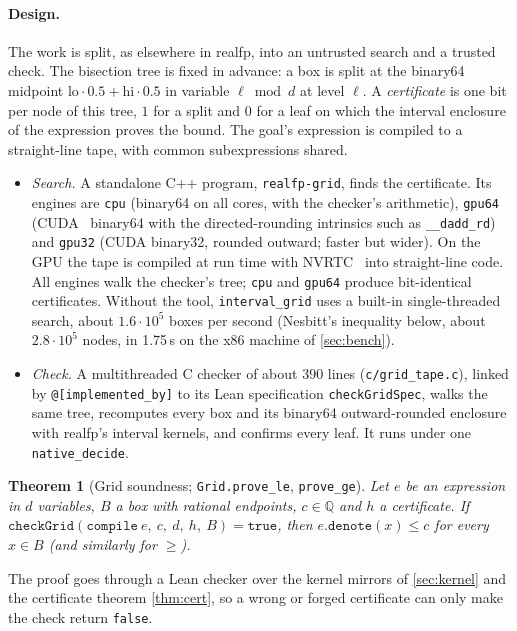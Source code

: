 \documentclass[11pt]{article}
\newtheorem{theorem}{Theorem}
\theoremstyle{definition}
\theoremstyle{remark}
\newcommand{\Q}{\mathbb{Q}}
\newcommand{\lean}[1]{\texttt{#1}}
\newcommand{\realfp}{\textsf{realfp}}
\begin{document}
\paragraph{Design.} The work is split, as elsewhere in \realfp{}, into an
untrusted search and a trusted check. The bisection tree is fixed in
advance: a box is split at the binary64 midpoint
$\mathrm{lo}\cdot0.5+\mathrm{hi}\cdot0.5$ in variable $\ell\bmod d$ at level
$\ell$. A \emph{certificate} is one bit per node of this tree, $1$ for a
split and $0$ for a leaf on which the interval enclosure of the expression
proves the bound. The goal's expression is compiled to a straight-line
tape, with common subexpressions shared.
\begin{itemize}[nosep]
\item \emph{Search.} A standalone C++ program, \lean{realfp-grid}, finds
  the certificate. Its engines are \lean{cpu} (binary64 on all cores, with
  the checker's arithmetic), \lean{gpu64} (CUDA~\cite{cuda} binary64 with
  the directed-rounding intrinsics such as \lean{\_\_dadd\_rd}) and
  \lean{gpu32} (CUDA binary32, rounded outward; faster but wider). On the
  GPU the tape is compiled at run time with NVRTC~\cite{nvrtc} into
  straight-line code. All engines walk the checker's tree; \lean{cpu} and
  \lean{gpu64} produce bit-identical certificates. Without the tool,
  \lean{interval\_grid} uses a built-in single-threaded search, about
  $1.6\cdot10^5$ boxes per second (Nesbitt's inequality below, about
  $2.8\cdot10^5$ nodes, in 1.75\,s on the x86 machine of \cref{sec:bench}).
\item \emph{Check.} A multithreaded C checker of about 390 lines
  (\lean{c/grid\_tape.c}), linked by \lean{@[implemented\_by]} to its Lean
  specification \lean{checkGridSpec}, walks the same tree, recomputes every
  box and its binary64 outward-rounded enclosure with \realfp{}'s interval
  kernels, and confirms every leaf. It runs under one \lean{native\_decide}.
\end{itemize}

\begin{theorem}[Grid soundness; \lean{Grid.prove\_le}, \lean{prove\_ge}]
\label{thm:grid}
Let $e$ be an expression in $d$ variables, $B$ a box with rational
endpoints, $c\in\Q$ and $h$ a certificate. If
$\lean{checkGrid}(\lean{compile}\ e,\ c,\ d,\ h,\ B)=\lean{true}$, then
$e.\lean{denote}(x)\le c$ for every $x\in B$ (and similarly for $\ge$).
\end{theorem}
The proof goes through a Lean checker over the kernel mirrors of
\cref{sec:kernel} and the certificate theorem \cref{thm:cert}, so a wrong
or forged certificate can only make the check return \lean{false}.
\end{document}

